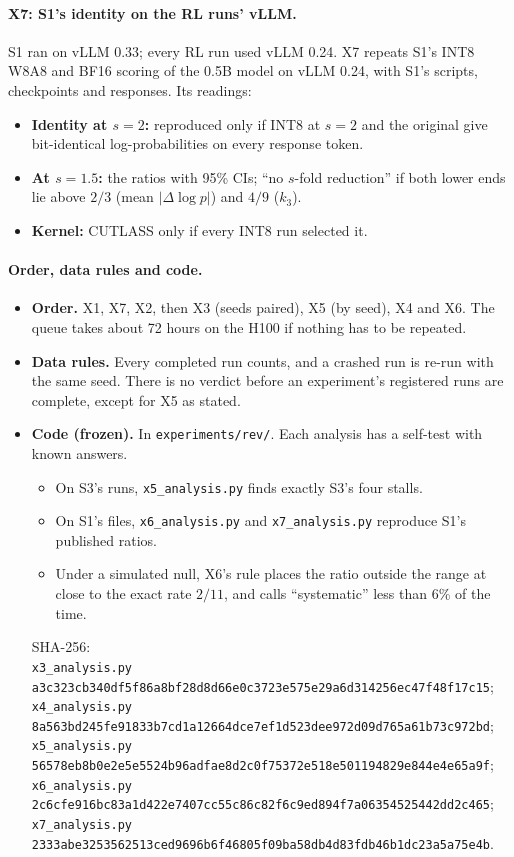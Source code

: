 \documentclass[11pt]{article}
\begin{document}
\paragraph{X7: S1's identity on the RL runs' vLLM.}
S1 ran on vLLM 0.33; every RL run used vLLM 0.24. X7 repeats S1's INT8 W8A8 and BF16 scoring of the 0.5B model on vLLM 0.24, with S1's scripts, checkpoints and responses. Its readings:
\begin{itemize}
\item \textbf{Identity at $s=2$:} reproduced only if INT8 at $s=2$ and the original give bit-identical log-probabilities on every response token.
\item \textbf{At $s=1.5$:} the ratios with 95\% CIs; ``no $s$-fold reduction'' if both lower ends lie above $2/3$ (mean $|\Delta\log p|$) and $4/9$ ($k_3$).
\item \textbf{Kernel:} CUTLASS only if every INT8 run selected it.
\end{itemize}

\paragraph{Order, data rules and code.}
\begin{itemize}
\item \textbf{Order.} X1, X7, X2, then X3 (seeds paired), X5 (by seed), X4 and X6. The queue takes about 72 hours on the H100 if nothing has to be repeated.
\item \textbf{Data rules.} Every completed run counts, and a crashed run is re-run with the same seed. There is no verdict before an experiment's registered runs are complete, except for X5 as stated.
\item \textbf{Code (frozen).} In \texttt{experiments/rev/}. Each analysis has a self-test with known answers.
  \begin{itemize}
  \item On S3's runs, \texttt{x5\_analysis.py} finds exactly S3's four stalls.
  \item On S1's files, \texttt{x6\_analysis.py} and \texttt{x7\_analysis.py} reproduce S1's published ratios.
  \item Under a simulated null, X6's rule places the ratio outside the range at close to the exact rate $2/11$, and calls ``systematic'' less than 6\% of the time.
  \end{itemize}
  SHA-256:\\
\texttt{x3\_analysis.py} \texttt{\small a3c323cb340df5f86a8bf28d8d66e0c3723e575e29a6d314256ec47f48f17c15};\\
\texttt{x4\_analysis.py} \texttt{\small 8a563bd245fe91833b7cd1a12664dce7ef1d523dee972d09d765a61b73c972bd};\\
\texttt{x5\_analysis.py} \texttt{\small 56578eb8b0e2e5e5524b96adfae8d2c0f75372e518e501194829e844e4e65a9f};\\
\texttt{x6\_analysis.py} \texttt{\small 2c6cfe916bc83a1d422e7407cc55c86c82f6c9ed894f7a06354525442dd2c465};\\
\texttt{x7\_analysis.py} \texttt{\small 2333abe3253562513ced9696b6f46805f09ba58db4d83fdb46b1dc23a5a75e4b}.
\end{itemize}
\end{document}
